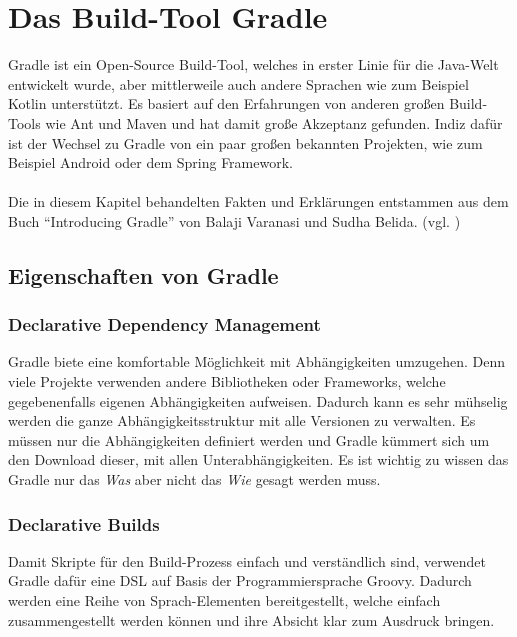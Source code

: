 
\section{Das Build-Tool Gradle}
Gradle ist ein Open-Source Build-Tool, welches in erster Linie für die Java-Welt entwickelt wurde, aber mittlerweile auch andere Sprachen wie zum Beispiel Kotlin unterstützt. Es basiert auf den Erfahrungen von anderen großen Build-Tools wie Ant und Maven und hat damit große Akzeptanz gefunden. Indiz dafür ist der Wechsel zu Gradle von ein paar großen bekannten Projekten, wie zum Beispiel Android oder dem Spring Framework.\\
\\
Die in diesem Kapitel behandelten Fakten und Erklärungen entstammen aus dem Buch \enquote{Introducing Gradle} von Balaji Varanasi und Sudha Belida. (vgl. \cite{introducingGradle})
\subsection{Eigenschaften von Gradle}
\subsubsection{Declarative Dependency Management}
Gradle biete eine komfortable Möglichkeit mit Abhängigkeiten umzugehen. Denn viele Projekte verwenden andere Bibliotheken oder Frameworks, welche gegebenenfalls eigenen Abhängigkeiten aufweisen. Dadurch kann es sehr mühselig werden die ganze Abhängigkeitsstruktur mit alle Versionen zu verwalten. Es müssen nur die Abhängigkeiten definiert werden und Gradle kümmert sich um den Download dieser, mit allen Unterabhängigkeiten. Es ist wichtig zu wissen das Gradle nur das \textit{Was} aber nicht das \textit{Wie} gesagt werden muss.

\subsubsection{Declarative Builds}
Damit Skripte für den Build-Prozess einfach und verständlich sind, verwendet Gradle dafür eine \gls{DSL} auf Basis der Programmiersprache Groovy. Dadurch werden eine Reihe von Sprach-Elementen bereitgestellt, welche einfach zusammengestellt werden können und ihre Absicht klar zum Ausdruck bringen.

